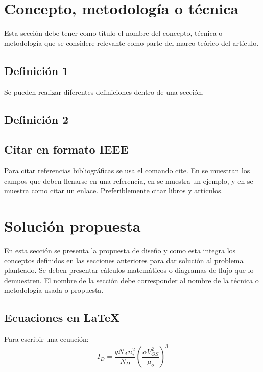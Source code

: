 \documentclass[journal]{IEEEtran}
\begin{document}
\section{Concepto, metodología o técnica}	
Esta sección debe tener como título el nombre del concepto, técnica o metodología que se considere relevante como parte del marco teórico del artículo.
\subsection{Definición 1}
Se pueden realizar diferentes definiciones dentro de una sección.

\subsection{Definición 2}

\subsection{Citar en formato IEEE}
Para citar referencias bibliográficas se usa el comando cite. En \cite{nombre_para_citar} se muestran los campos que deben llenarse en una referencia, en \cite{kopka} se muestra un ejemplo, y en \cite{link} se muestra como citar un enlace. Preferiblemente citar libros y artículos.

\section{Solución propuesta}
En esta sección se presenta la propuesta de diseño y como esta integra los conceptos definidos en las secciones anteriores para dar solución al problema planteado. Se deben presentar cálculos matemáticos o diagramas de flujo que lo demuestren. El nombre de la sección debe corresponder al nombre de la técnica o metodología usada o propuesta.

\subsection{Ecuaciones en \LaTeX}
Para escribir una ecuación:
\begin{equation}\label{eqID}
I_D=\frac{q N_A n_i^2}{N_D}\left(\frac{\alpha V_{GS}^2}{\mu_o}\right)^3
\end{equation}
\end{document}
